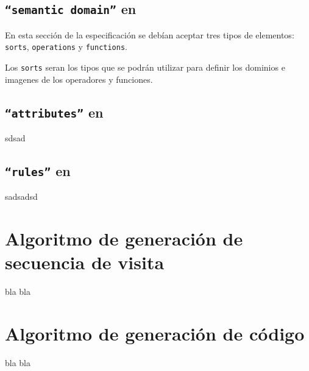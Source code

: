 \subsection{\texttt{``semantic domain''} en \spirit}

En esta sección de la especificación se debían aceptar tres tipos de elementos: \texttt{sorts}, \texttt{operations} y \texttt{functions}.

Los \texttt{sorts} seran los tipos que se podrán utilizar para definir los dominios e imagenes de los operadores y funciones.

\subsection{\texttt{``attributes''} en \spirit }
sdsad


\subsection{\texttt{``rules''} en \spirit }

sadsadsd

\section{Algoritmo de generaci\'on de secuencia de visita}

bla bla
\section{Algoritmo de generaci\'on de c\'odigo}
bla bla
